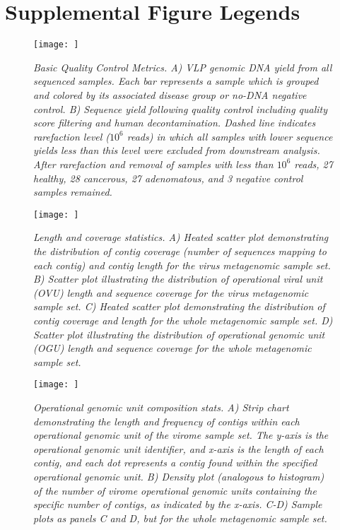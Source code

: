 \documentclass[12pt,]{article}
\newcommand{\beginsupplement}{%
        \setcounter{table}{0}
        \renewcommand{\thetable}{S\arabic{table}}%
        \setcounter{figure}{0}
        \renewcommand{\thefigure}{S\arabic{figure}}%
     }
\begin{document}
\newpage

\section{Supplemental Figure Legends}\label{supplemental-figure-legends}

\beginsupplement

\begin{figure}[htbp]
\centering
\texttt{[image: ]}
\caption{\emph{Basic Quality Control Metrics. A) VLP genomic DNA yield
from all sequenced samples. Each bar represents a sample which is
grouped and colored by its associated disease group or no-DNA negative
control. B) Sequence yield following quality control including quality
score filtering and human decontamination. Dashed line indicates
rarefaction level (\(10^6\) reads) in which all samples with lower
sequence yields less than this level were excluded from downstream
analysis. After rarefaction and removal of samples with less than
\(10^6\) reads, 27 healthy, 28 cancerous, 27 adenomatous, and 3 negative
control samples remained.}\label{qualcontrol}}
\end{figure}

\newpage

\begin{figure}[htbp]
\centering
\texttt{[image: ]}
\caption{\emph{Length and coverage statistics. A) Heated scatter plot
demonstrating the distribution of contig coverage (number of sequences
mapping to each contig) and contig length for the virus metagenomic
sample set. B) Scatter plot illustrating the distribution of operational
viral unit (OVU) length and sequence coverage for the virus metagenomic
sample set. C) Heated scatter plot demonstrating the distribution of
contig coverage and length for the whole metagenomic sample set. D)
Scatter plot illustrating the distribution of operational genomic unit
(OGU) length and sequence coverage for the whole metagenomic sample
set.}\label{contigqc}}
\end{figure}

\newpage

\begin{figure}[htbp]
\centering
\texttt{[image: ]}
\caption{\emph{Operational genomic unit composition stats. A) Strip
chart demonstrating the length and frequency of contigs within each
operational genomic unit of the virome sample set. The y-axis is the
operational genomic unit identifier, and x-axis is the length of each
contig, and each dot represents a contig found within the specified
operational genomic unit. B) Density plot (analogous to histogram) of
the number of virome operational genomic units containing the specific
number of contigs, as indicated by the x-axis. C-D) Sample plots as
panels C and D, but for the whole metagenomic sample
set.}\label{clustercontigqc}}
\end{figure}
\end{document}
